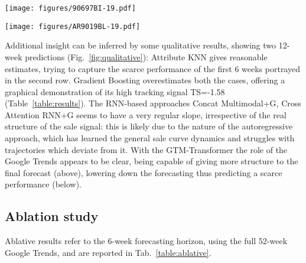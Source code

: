 \documentclass{article}
\newcommand{\datasetname}[0] {VISUELLE}
\newcommand{\approachname}[0] {GTM-Transformer\xspace}
\begin{document}
\begin{figure*}[h]
\hspace{-2cm}
    \texttt{[image: figures/90697BI-19.pdf]}
    
    \hspace{-2cm}
        \texttt{[image: figures/AR9019BL-19.pdf]}
\caption{Qualitative Results}
    \label{fig:qualitative}
\end{figure*}

Additional insight can be inferred by some qualitative results, showing two 12-week predictions (Fig.~\ref{fig:qualitative}): Attribute KNN gives reasonable estimates, trying to capture the scarce performance of the first 6 weeks portrayed in the second row. Gradient Boosting overestimates both the cases, offering a graphical demonstration of its high tracking signal TS=-1.58 (Table~\ref{table:results}). The RNN-based approaches Concat Multimodal+G, Cross Attention RNN+G seems to have a very regular slope, irrespective of the real structure of the sale signal: this is likely due to the nature of the autoregressive approach, which has learned the general sale curve dynamics and struggles with trajectories which deviate from it. With the \approachname the role of the Google Trends appears to be clear, being capable of giving more structure to the final forecast (above), lowering down the forecasting thus predicting a scarce performance (below). 


\subsection{Ablation study}\label{sec:exp:abla}
Ablative results refer to the 6-week forecasting horizon, using the full 52-week Google Trends, and are reported in Tab.~\ref{table:ablative}.   
\begin{table}[h]
\footnotesize
\centering
{}
\vspace{0.15cm}
\caption{6 weeks ablative results on \datasetname. MAE is reported with also its values at 25-th and 75-th percentiles in parenthesis.}
\label{table:ablative}
\end{table}
\end{document}
